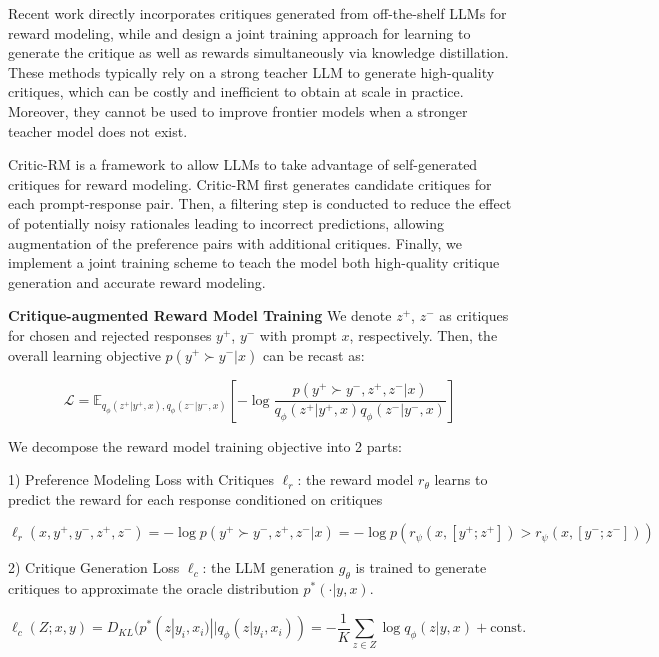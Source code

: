 Recent work \autocite{ye2024improvingrewardmodelssynthetic} directly incorporates critiques generated from off-the-shelf LLMs for reward modeling, while \autocite{ankner2024critiqueoutloudrewardmodels} and \autocite{zhang2024generativeverifiersrewardmodeling} design a joint training approach for learning to generate the critique as well as rewards simultaneously via knowledge distillation. These methods typically rely on a strong teacher LLM to generate high-quality critiques, which can be costly and inefficient to obtain at scale in practice. Moreover, they cannot be used to improve frontier models when a stronger teacher model does not exist.

Critic-RM \autocite{yu2025selfgeneratedcritiquesboostreward} is a framework to allow LLMs to take advantage of self-generated critiques for reward modeling. Critic-RM first generates candidate critiques for each prompt-response pair. Then, a filtering step is conducted to reduce the effect of potentially noisy rationales leading to incorrect predictions, allowing augmentation of the preference pairs with additional critiques. Finally, we implement a joint training scheme to teach the model both high-quality critique generation and accurate reward modeling.

\textbf{Critique-augmented Reward Model Training} We denote $z^+$, $z^-$ as critiques for chosen and rejected responses $y^+$, $y^-$ with prompt $x$, respectively. Then, the overall learning objective $p(y^+ \succ y^- | x)$ can be recast as:

$$\mathcal{L} = \mathbb{E}_{q_\phi(z^+|y^+,x),q_\phi(z^-|y^-,x)} \left[-\log \frac{p(y^+ \succ y^-, z^+, z^- | x)}{q_\phi(z^+ | y^+, x) q_\phi(z^- | y^-, x)}\right]$$

We decompose the reward model training objective into 2 parts:

1) Preference Modeling Loss with Critiques $\ell_r$: the reward model $r_\theta$ learns to predict the reward for each response conditioned on critiques

$$\ell_r(x, y^+, y^-, z^+, z^-) = - \log p(y^+ \succ y^-, z^+, z^- | x) = - \log p(r_\psi(x, [y^+; z^+]) > r_\psi(x, [y^-; z^-]))$$

2) Critique Generation Loss $\ell_c$: the LLM generation $g_\theta$ is trained to generate critiques to approximate the oracle distribution $p^*({\cdot} | y, x)$.

$$\ell_c(Z; x, y) = D_{KL}(p^*(z | y_i, x_i)||q_\phi(z | y_i, x_i)) = -\frac{1}{K}\sum_{z\in Z} \log q_\phi(z | y, x) + \text{const.}$$

